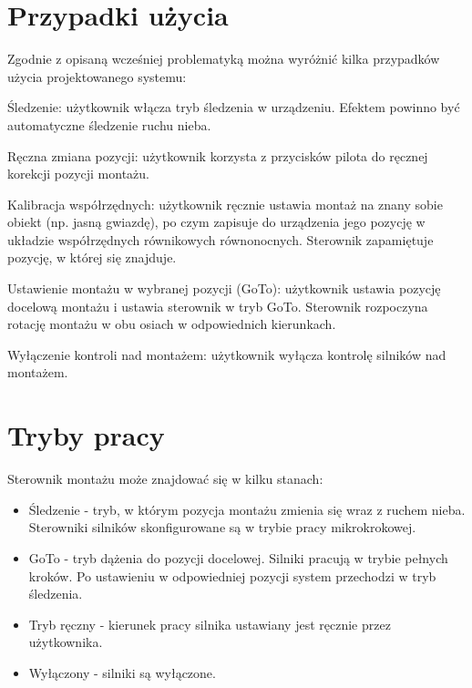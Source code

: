 \section{Przypadki użycia}

Zgodnie z opisaną wcześniej problematyką można wyróżnić kilka przypadków
użycia projektowanego systemu:

Śledzenie: użytkownik włącza tryb śledzenia w urządzeniu. Efektem powinno być
automatyczne śledzenie ruchu nieba.

Ręczna zmiana pozycji: użytkownik korzysta z przycisków pilota do ręcznej
korekcji pozycji montażu.

Kalibracja współrzędnych: użytkownik ręcznie ustawia montaż na znany sobie
obiekt (np. jasną gwiazdę), po czym zapisuje do urządzenia jego pozycję
w układzie współrzędnych równikowych równonocnych. Sterownik zapamiętuje
pozycję, w której się znajduje.

Ustawienie montażu w wybranej pozycji (GoTo): użytkownik ustawia pozycję
docelową montażu i ustawia sterownik w tryb GoTo. Sterownik rozpoczyna rotację
montażu w obu osiach w odpowiednich kierunkach.

Wyłączenie kontroli nad montażem: użytkownik wyłącza kontrolę silników nad
montażem.

\section{Tryby pracy}

Sterownik montażu może znajdować się w kilku stanach:

\begin{itemize}

\item Śledzenie - tryb, w którym pozycja montażu zmienia się wraz z ruchem
nieba.  Sterowniki silników skonfigurowane są w trybie pracy mikrokrokowej.

\item GoTo - tryb dążenia do pozycji docelowej. Silniki pracują w trybie pełnych
kroków. Po ustawieniu w odpowiedniej pozycji system przechodzi w tryb śledzenia.

\item Tryb ręczny - kierunek pracy silnika ustawiany jest ręcznie przez
użytkownika.

\item Wyłączony - silniki są wyłączone.

\end{itemize}

